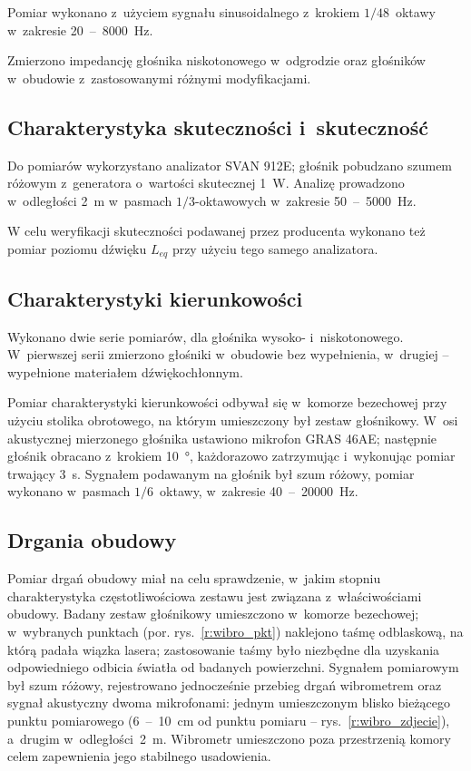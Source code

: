 \documentclass[12pt]{oska}
\newcommand{\range}[2]{\num{#1}~--~\num{#2}}
\begin{document}
			
			Pomiar wykonano z~użyciem sygnału sinusoidalnego z~krokiem $1/48$~oktawy w~zakresie \range{20}{8000}~\si{\hertz}.
			
			Zmierzono impedancję głośnika niskotonowego w~odgrodzie oraz głośników w~obudowie z~zastosowanymi różnymi modyfikacjami. 
			
		\subsection{Charakterystyka skuteczności i~skuteczność}
			
			Do pomiarów wykorzystano analizator SVAN 912E; głośnik pobudzano szumem różowym z~generatora o~wartości skutecznej \SI{1}{\watt}. Analizę prowadzono w~odległości \SI{2}{\metre} w~pasmach $1/3$-oktawowych w~zakresie \range{50}{5000}~\si{\hertz}.

			W celu weryfikacji skuteczności podawanej przez producenta wykonano też pomiar poziomu dźwięku $L_{eq}$ przy użyciu tego samego analizatora. 
			
		\subsection{Charakterystyki kierunkowości}
			
			Wykonano dwie serie pomiarów, dla głośnika wysoko- i~niskotonowego. W~pierwszej serii zmierzono głośniki w~obudowie bez wypełnienia, w~drugiej -- wypełnione materiałem dźwiękochłonnym.
			
			Pomiar charakterystyki kierunkowości odbywał się w~komorze bezechowej przy użyciu stolika obrotowego, na którym umieszczony był zestaw głośnikowy. W~osi akustycznej mierzonego głośnika ustawiono mikrofon GRAS 46AE; następnie głośnik obracano z~krokiem \SI{10}{\degree}, każdorazowo zatrzymując i~wykonując pomiar trwający \SI{3}{\s}. Sygnałem podawanym na głośnik był szum różowy, pomiar wykonano w~pasmach $1/6$~oktawy, w~zakresie \range{40}{20000}~\si{\hertz}.
			
		\subsection{Drgania obudowy}
			
			Pomiar drgań obudowy miał na celu sprawdzenie, w~jakim stopniu charakterystyka częstotliwościowa zestawu jest związana z~właściwościami obudowy. Badany zestaw głośnikowy umieszczono w~komorze bezechowej; w~wybranych punktach (por. rys.~\ref{r:wibro_pkt}) naklejono taśmę odblaskową, na którą padała wiązka lasera; zastosowanie taśmy było niezbędne dla uzyskania odpowiedniego odbicia światła od badanych powierzchni. %
			Sygnałem pomiarowym był szum różowy, rejestrowano jednocześnie przebieg drgań wibrometrem oraz sygnał akustyczny dwoma mikrofonami: jednym umieszczonym blisko bieżącego punktu pomiarowego (\range{6}{10}~\si{\cm} od punktu pomiaru -- rys.~\ref{r:wibro_zdjecie}), a~drugim w~odległości~\SI{2}{\metre}. Wibrometr umieszczono poza przestrzenią komory celem zapewnienia jego stabilnego usadowienia.
			
\end{document}
